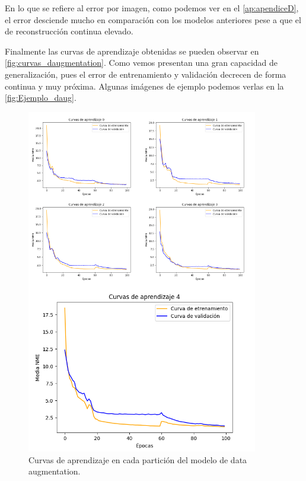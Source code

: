         \medskip

        \noindent En lo que se refiere al error por imagen, como podemos ver en el \autoref{ap:apendiceD}, el error desciende mucho en comparación con los modelos anteriores pese a que el de reconstrucción continua elevado.

        \medskip

        \noindent Finalmente las curvas de aprendizaje obtenidas se pueden observar en \autoref{fig:curvas_daugmentation}. Como vemos presentan una gran capacidad de generalización, pues el error de entrenamiento y validación decrecen de forma continua y muy próxima. Algunas imágenes de ejemplo podemos verlas en la \autoref{fig:Ejemplo_daug}.

        \begin{figure}[H]
            \centering
            \includegraphics[width=0.9\textwidth]{img/curvas_daugmentation.png}
            \caption{Curvas de aprendizaje en cada partición del modelo de data augmentation.}
            \label{fig:curvas_daugmentation}
        \end{figure}

